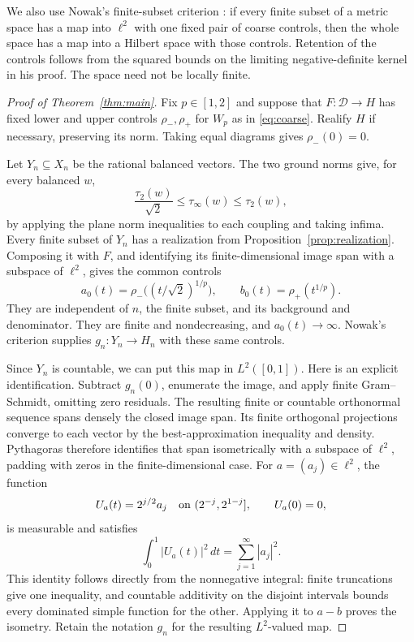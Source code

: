 \documentclass[11pt]{article}
\theoremstyle{remark}
\newcommand{\D}{\mathcal D}
\begin{document}
We also use Nowak's finite-subset criterion \cite[Theorem~3.4]{nowak}: if every finite subset of a metric space has a map into \(\ell^2\) with one fixed pair of coarse controls, then the whole space has a map into a Hilbert space with those controls. Retention of the controls follows from the squared bounds on the limiting negative-definite kernel in his proof. The space need not be locally finite.

\begin{proof}[Proof of Theorem~\ref{thm:main}]
Fix \(p\in[1,2]\) and suppose that \(F:\D\to H\) has fixed lower and upper controls \(\rho_-,\rho_+\) for \(W_p\) as in \eqref{eq:coarse}. Realify \(H\) if necessary, preserving its norm. Taking equal diagrams gives \(\rho_-(0)=0\).

Let \(Y_n\subseteq X_n\) be the rational balanced vectors. The two ground norms give, for every balanced \(w\),
\begin{equation}
 \frac{\tau_2(w)}{\sqrt2}\le\tau_\infty(w)\le\tau_2(w),
 \label{eq:comparison}
\end{equation}
by applying the plane norm inequalities to each coupling and taking infima.
Every finite subset of \(Y_n\) has a realization from Proposition~\ref{prop:realization}. Composing it with \(F\), and identifying its finite-dimensional image span with a subspace of \(\ell^2\), gives the common controls
\begin{equation}
 a_0(t)=\rho_-\bigl((t/\sqrt2)^{1/p}\bigr),\qquad
 b_0(t)=\rho_+(t^{1/p}).
 \label{eq:controls0}
\end{equation}
They are independent of \(n\), the finite subset, and its background and denominator. They are finite and nondecreasing, and \(a_0(t)\to\infty\).
Nowak's criterion supplies \(g_n:Y_n\to H_n\) with these same controls.

Since \(Y_n\) is countable, we can put this map in \(L^2([0,1])\). Here is an explicit identification. Subtract \(g_n(0)\), enumerate the image, and apply finite Gram--Schmidt, omitting zero residuals. The resulting finite or countable orthonormal sequence spans densely the closed image span. Its finite orthogonal projections converge to each vector by the best-approximation inequality and density. Pythagoras therefore identifies that span isometrically with a subspace of \(\ell^2\), padding with zeros in the finite-dimensional case. For \(a=(a_j)\in\ell^2\), the function
\[
 U_a(t)=2^{j/2}a_j\quad\hbox{on }(2^{-j},2^{1-j}],\qquad U_a(0)=0,
\]
is measurable and satisfies
\[
 \int_0^1|U_a(t)|^2\,dt=\sum_{j=1}^\infty |a_j|^2.
\]
This identity follows directly from the nonnegative integral: finite truncations give one inequality, and countable additivity on the disjoint intervals bounds every dominated simple function for the other. Applying it to \(a-b\) proves the isometry. Retain the notation \(g_n\) for the resulting \(L^2\)-valued map.


\end{proof}
\end{document}
